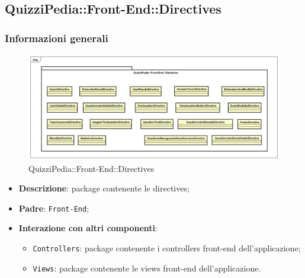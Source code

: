 \newpage

\subsection{QuizziPedia::Front-End::Directives}
\subsubsection{Informazioni generali}
\label{QuizziPedia::Front-End::Directives}
\begin{figure}
	\centering
	\includegraphics[scale=0.45]{UML/Package/QuizziPedia_Front-End_Directives.png}
	\caption{QuizziPedia::Front-End::Directives}
\end{figure}
\begin{itemize}
	\item \textbf{Descrizione}: package contenente le directives;
	\item \textbf{Padre}: \texttt{Front-End};
	\item \textbf{Interazione con altri componenti}:
	\begin{itemize}
		\item \texttt{Controllers}: package contenente i controllers front-end dell'applicazione;
		\item \texttt{Views}: package contenente le views front-end dell'applicazione.
	\end{itemize}
\end{itemize}
